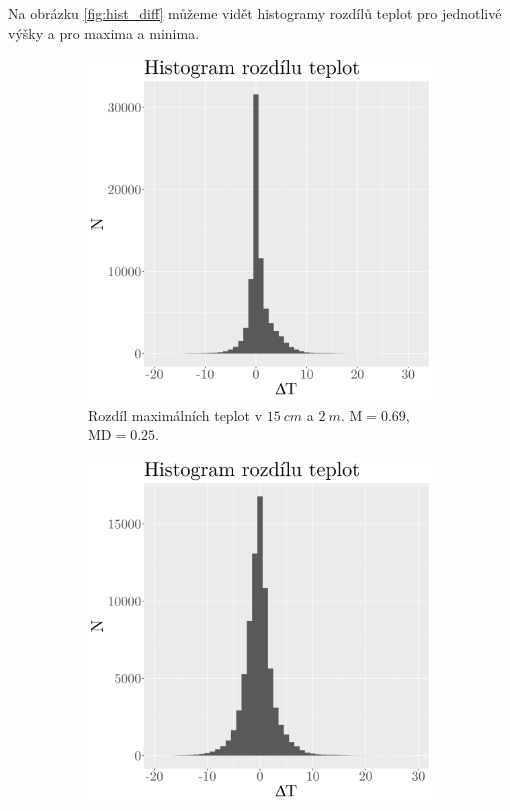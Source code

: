 Na obrázku \ref{fig:hist_diff} můžeme vidět histogramy rozdílů teplot pro jednotlivé výšky a pro maxima a minima.

\begin{figure}
	\centering
	\begin{subfigure}{0.45\textwidth}
  \includegraphics[width=\textwidth]{img/ch2/hist_diff_max15cm.png}
		\caption{Rozdíl maximálních teplot v $\SI{15}{cm}$ a $\SI{2}{m}$. $\text{M} = 0.69$, $\text{MD} = 0.25$.}
		\label{fig:hist_diff_max15cm}
	\end{subfigure}
	\hfill
	\begin{subfigure}{0.45\textwidth}
  \includegraphics[width=\textwidth]{img/ch2/hist_diff_max0cm.png}

\end{subfigure}
\end{figure}
